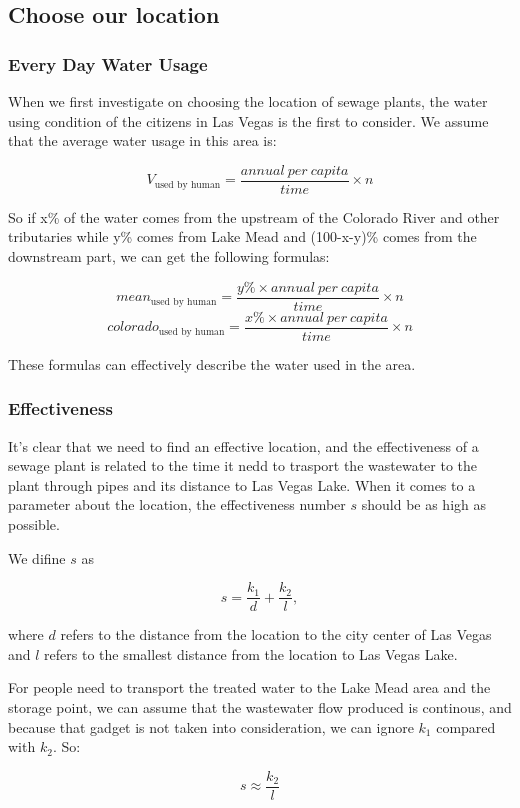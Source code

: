 \documentclass[12pt]{article}
\theoremstyle{definition}
\theoremstyle{remark}
\numberwithin{equation}{section}
\begin{document}
	\subsection{Choose our location}
		\subsubsection{Every Day Water Usage}
			When we first investigate on choosing the location of sewage plants, the water using condition of the citizens in Las Vegas is the first to consider.
			We assume that the average water usage in this area is:

			$$V_{\text{used by human}}=\frac{annual\ per\ capita}{time}\times{n}$$

			So if x\% of the water comes from the upstream of the Colorado River and other tributaries while y\% comes from Lake Mead and (100-x-y)\% comes from the downstream part, we can get the following formulas:

			$$mean_{\text{used by human}}=\frac{{y\%}\times{annual\ per\ capita}}{time}\times{n}$$
			$$colorado_{\text{used by human}}=\frac{{x\%}\times{annual\ per\ capita}}{time}\times{n}$$

			These formulas can effectively describe the water used in the area.

		\subsubsection{Effectiveness}
			It's clear that we need to find an effective location, and the effectiveness of a sewage plant is related to the time it nedd to trasport the wastewater to the plant through pipes and its distance to Las Vegas Lake. When it comes to a parameter about the location, the effectiveness number $s$ should be as high as possible.

			We difine $s$ as

			$$s=\frac{k_1}{d}+\frac{k_2}{l},$$

			where $d$ refers to the distance from the location to the city center of Las Vegas and $l$ refers to the smallest distance from the location to Las Vegas Lake.

			For people need to transport the treated water to the Lake Mead area and the storage point, we can assume that the wastewater flow produced is continous, and because that gadget is not taken into consideration, we can ignore $k_1$ compared with $k_2$. So:

			$$s\approx\frac{k_2}{l}$$
\end{document}
